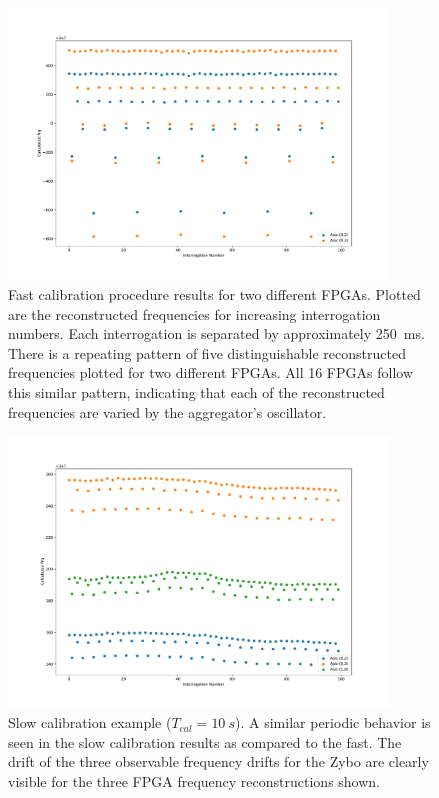 \begin{figure}[]
\centering
\includegraphics[width=0.9\textwidth]{images/fast_example.pdf}
\caption{Fast calibration procedure results for two different FPGAs.
Plotted are the reconstructed frequencies for increasing interrogation numbers.
Each interrogation is separated by approximately 250~\unit{ms}.
There is a repeating pattern of five distinguishable reconstructed frequencies plotted for two different FPGAs.
All 16 FPGAs follow this similar pattern, indicating that each of the reconstructed frequencies are varied by the aggregator's oscillator.
}
\label{fig:fast_example}
\end{figure}

\begin{figure}[]
\centering
\includegraphics[width=0.9\textwidth]{images/slow_example.pdf}
\caption{Slow calibration example ($T_{cal} = 10~\unit{s}$).
A similar periodic behavior is seen in the slow calibration results as compared to the fast.
The drift of the three observable frequency drifts for the Zybo are clearly visible for the three FPGA frequency reconstructions shown. 
}
\end{figure}

